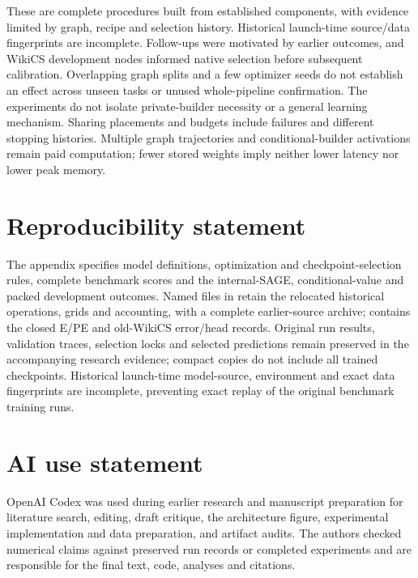 \documentclass{article}
\begin{document}
These are complete procedures built from established components, with evidence limited by graph, recipe and selection history. Historical launch-time source/data fingerprints are incomplete. Follow-ups were motivated by earlier outcomes, and WikiCS development nodes informed native selection before subsequent calibration. Overlapping graph splits and a few optimizer seeds do not establish an effect across unseen tasks or unused whole-pipeline confirmation. The experiments do not isolate private-builder necessity or a general learning mechanism. Sharing placements and budgets include failures and different stopping histories. Multiple graph trajectories and conditional-builder activations remain paid computation; fewer stored weights imply neither lower latency nor lower peak memory.

\section*{Reproducibility statement}
The appendix specifies model definitions, optimization and checkpoint-selection rules, complete benchmark scores and the internal-SAGE, conditional-value and packed development outcomes. Named files in  retain the relocated historical operations, grids and accounting, with a complete earlier-source archive;  contains the closed E/PE and old-WikiCS error/head records. Original run results, validation traces, selection locks and selected predictions remain preserved in the accompanying research evidence; compact copies do not include all trained checkpoints. Historical launch-time model-source, environment and exact data fingerprints are incomplete, preventing exact replay of the original benchmark training runs.

\section*{AI use statement}
OpenAI Codex was used during earlier research and manuscript preparation for literature search, editing, draft critique, the architecture figure, experimental implementation and data preparation, and artifact audits. The authors checked numerical claims against preserved run records or completed experiments and are responsible for the final text, code, analyses and citations.



\clearpage
\appendix
\renewcommand{\thesection}{A\arabic{section}}
\renewcommand{\theHsection}{appendix.\arabic{section}}
\renewcommand{\thefootnote}{\arabic{footnote}}

\end{document}
